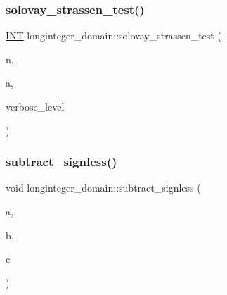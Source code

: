 \mbox{\label{classlonginteger__domain_a91e8824ed631a5b32239e3d9027d6578}} 
\subsubsection{\texorpdfstring{solovay\+\_\+strassen\+\_\+test()}{solovay\_strassen\_test()}}
{\footnotesize\ttfamily \mbox{\hyperlink{galois_8h_a09fddde158a3a20bd2dcadb609de11dc}{I\+NT}} longinteger\+\_\+domain\+::solovay\+\_\+strassen\+\_\+test (\begin{DoxyParamCaption}\item[{\mbox{\hyperlink{classlonginteger__object}{longinteger\+\_\+object}} \&}]{n,  }\item[{\mbox{\hyperlink{classlonginteger__object}{longinteger\+\_\+object}} \&}]{a,  }\item[{\mbox{\hyperlink{galois_8h_a09fddde158a3a20bd2dcadb609de11dc}{I\+NT}}}]{verbose\+\_\+level }\end{DoxyParamCaption})}

\mbox{\label{classlonginteger__domain_ae3c122c0ba79ac3bf90bf8dbdd245826}} 
\subsubsection{\texorpdfstring{subtract\+\_\+signless()}{subtract\_signless()}}
{\footnotesize\ttfamily void longinteger\+\_\+domain\+::subtract\+\_\+signless (\begin{DoxyParamCaption}\item[{\mbox{\hyperlink{classlonginteger__object}{longinteger\+\_\+object}} \&}]{a,  }\item[{\mbox{\hyperlink{classlonginteger__object}{longinteger\+\_\+object}} \&}]{b,  }\item[{\mbox{\hyperlink{classlonginteger__object}{longinteger\+\_\+object}} \&}]{c }\end{DoxyParamCaption})}

\mbox{\label{classlonginteger__domain_ac3a5c472a3dfa53ce08843fbbf7150c2}} 
